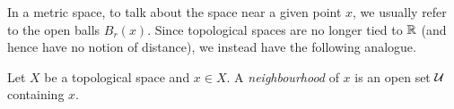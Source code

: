 \documentclass[11pt]{article}
\begin{document}
In a metric space, to talk about the space near a given point $x$, we usually refer to the open balls $B_r(x)$. Since topological spaces are no longer tied to $\mathbb{R}$ (and hence have no notion of distance), we instead have the following analogue.
\begin{definition}[Neighbourhood]
    Let $X$ be a topological space and $x \in X$. A \emph{neighbourhood} of $x$ is an open set $\mathcal{U}$ containing $x$.
\end{definition}








\end{document}
